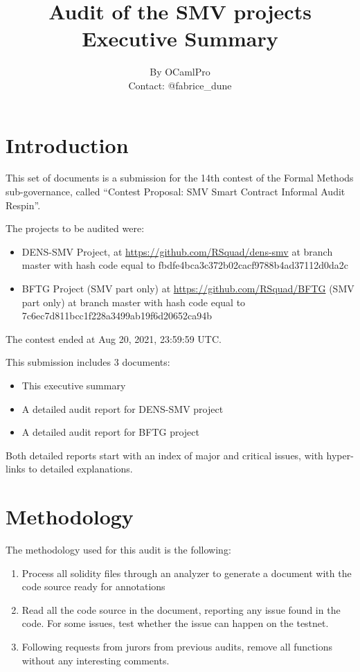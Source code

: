 \documentclass{article}
\begin{document}
\title{Audit of the SMV projects\\Executive Summary}
\author{By OCamlPro\\Contact: @fabrice\_dune}
\maketitle

\section{Introduction}

This set of documents is a submission for the 14th contest of the
Formal Methods sub-governance, called ``Contest Proposal: SMV Smart
Contract Informal Audit Respin''.

The projects to be audited were:
\begin{itemize}
\item DENS-SMV Project, at \url{https://github.com/RSquad/dens-smv} at branch master with
  hash code equal to fbdfe4bca3c372b02cacf9788b4ad37112d0da2c
\item BFTG Project (SMV part only) at
  \url{https://github.com/RSquad/BFTG} (SMV part only) at branch
  master with hash code equal to
  7c6ec7d811bcc1f228a3499ab19f6d20652ca94b
\end{itemize}

The contest ended at Aug 20, 2021, 23:59:59 UTC.

This submission includes 3 documents:
\begin{itemize}
\item This executive summary
\item A detailed audit report for DENS-SMV project
\item A detailed audit report for BFTG project
\end{itemize}

Both detailed reports start with an index of major and critical
issues, with hyper-links to detailed explanations.

\section{Methodology}

The methodology used for this audit is the following:
\begin{enumerate}
\item Process all solidity files through an analyzer to generate a
  document with the code source ready for annotations
\item Read all the code source in the document, reporting any issue
  found in the code. For some issues, test whether the issue can
  happen on the testnet.
\item Following requests from jurors from previous audits, remove all
  functions without any interesting comments.
\end{enumerate}
\end{document}
